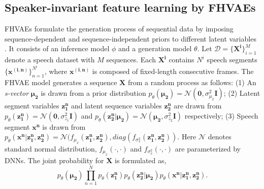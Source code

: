 \documentclass[a4paper]{article}
\begin{document}
\subsection{Speaker-invariant feature learning by FHVAEs}
\label{subsec:fhvae}
FHVAEs formulate the generation process of sequential data by imposing sequence-dependent and sequence-independent priors to different latent variables \cite{hsu2017nips}. It consists of an inference model $\phi$ and a generation model $\theta$.
Let $\mathcal{D}=\{\bm{X^{i}}\}_{i=1}^{M}$ denote a speech dataset with $M$ sequences. 
Each $\bm{X^i}$ contains $N^i$ speech segments $\{\bm{x^{(i,n)}}\}^{N^i}_{n=1}$, where $\bm{x^{(i,n)}}$ is composed of fixed-length consecutive 
frames. The FHVAE model generates a sequence $\bm{X}$ from a random process as follows: 
(1) An \textit{s-vector} $\bm{\mu_2 }$ is drawn from a prior distribution $p_{\theta}(\bm{\mu_2})=\mathcal{N} (\bm{0},\sigma^2_{\mu_2} \bm{I})$;
(2) Latent segment variables $\bm{z_1 ^{n}} $ and latent sequence variables $\bm{z_2^{n}} $ are drawn from $p_{\theta}(\bm{z_1 ^{n}})=\mathcal{N} (\bm{0}, {\sigma^2_{z_1}} \bm{I})$ and  $p_{\theta}(\bm{z_2 ^{n}| \bm{\mu_2}})=\mathcal{N}(\bm{\mu_2}, {\sigma^2_{z_2}} \bm{I} )$ respectively;
(3) Speech segment $\bm{x^{n}}$ is drawn from $p_{\theta}(\bm{x^{n}}|\bm{z_1 ^{n}, \bm{z_2^{n}}})=\mathcal{N}(f_{\mu_x} (\bm{z_1 ^{n}}, \bm{z_2^{n}}), diag(f_{\sigma^2_x} (\bm{z_1 ^{n}}, \bm{z_2^{n}}))$.
Here $\mathcal{N}$ denotes standard normal distribution, $ f_{\mu_x} (\cdot, \cdot)$ and $ f_{\sigma^2_x} (\cdot, \cdot)$ are parameterized by DNNs.
The joint probability for $\bm{X}$ is formulated as,
\begin{equation}
    p_{\theta} (\bm{\mu_2})\prod_{n=1}^{N} p_{\theta} (\bm{z_1^n}) p_{\theta} (\bm{z_2^{n}}|\bm{\mu_2})p_{\theta} (\bm{x^n}|\bm{z_1 ^{n}, \bm{z_2^{n}}}).
\end{equation}
\end{document}
